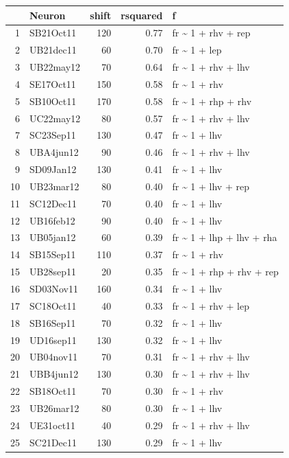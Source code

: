 \documentclass[]{article}
\begin{document}
\begin{table}[ht]
\centering
\begin{tabular}{rlrrl}
  \hline
 & Neuron & shift & rsquared & f \\ 
  \hline
1 & SB21Oct11 & 120 & 0.77 & fr \~{} 1 + rhv + rep \\ 
  2 & UB21dec11 &  60 & 0.70 & fr \~{} 1 + lep \\ 
  3 & UB22may12 &  70 & 0.64 & fr \~{} 1 + rhv + lhv \\ 
  4 & SE17Oct11 & 150 & 0.58 & fr \~{} 1 + rhv \\ 
  5 & SB10Oct11 & 170 & 0.58 & fr \~{} 1 + rhp + rhv \\ 
  6 & UC22may12 &  80 & 0.57 & fr \~{} 1 + rhv + lhv \\ 
  7 & SC23Sep11 & 130 & 0.47 & fr \~{} 1 + lhv \\ 
  8 & UBA4jun12 &  90 & 0.46 & fr \~{} 1 + rhv + lhv \\ 
  9 & SD09Jan12 & 130 & 0.41 & fr \~{} 1 + lhv \\ 
  10 & UB23mar12 &  80 & 0.40 & fr \~{} 1 + lhv + rep \\ 
  11 & SC12Dec11 &  70 & 0.40 & fr \~{} 1 + lhv \\ 
  12 & UB16feb12 &  90 & 0.40 & fr \~{} 1 + lhv \\ 
  13 & UB05jan12 &  60 & 0.39 & fr \~{} 1 + lhp + lhv + rha \\ 
  14 & SB15Sep11 & 110 & 0.37 & fr \~{} 1 + rhv \\ 
  15 & UB28sep11 &  20 & 0.35 & fr \~{} 1 + rhp + rhv + rep \\ 
  16 & SD03Nov11 & 160 & 0.34 & fr \~{} 1 + lhv \\ 
  17 & SC18Oct11 &  40 & 0.33 & fr \~{} 1 + rhv + lep \\ 
  18 & SB16Sep11 &  70 & 0.32 & fr \~{} 1 + lhv \\ 
  19 & UD16sep11 & 130 & 0.32 & fr \~{} 1 + lhv \\ 
  20 & UB04nov11 &  70 & 0.31 & fr \~{} 1 + rhv + lhv \\ 
  21 & UBB4jun12 & 130 & 0.30 & fr \~{} 1 + rhv + lhv \\ 
  22 & SB18Oct11 &  70 & 0.30 & fr \~{} 1 + rhv \\ 
  23 & UB26mar12 &  80 & 0.30 & fr \~{} 1 + lhv \\ 
  24 & UE31oct11 &  40 & 0.29 & fr \~{} 1 + rhv + lhv \\ 
  25 & SC21Dec11 & 130 & 0.29 & fr \~{} 1 + lhv \\ 

\end{tabular}
\end{table}
\end{document}
